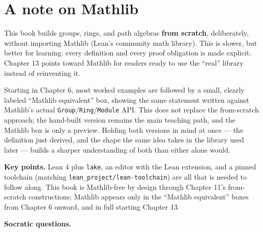 \section{A note on Mathlib}\label{sec:00-setup:04-mathlib-note:1}

This book builds groups, rings, and path algebras \textbf{from scratch}, deliberately, without importing Mathlib (Lean's community math library). This is slower, but better for learning: every definition and every proof obligation is made explicit. Chapter 13 points toward Mathlib for readers ready to use the ``real'' library instead of reinventing it.

Starting in Chapter 6, most worked examples are followed by a small, clearly labeled ``Mathlib equivalent'' box, showing the same statement written against Mathlib's actual \texttt{Group}/\texttt{Ring}/\texttt{Module} API. This does not replace the from-scratch approach; the hand-built version remains the main teaching path, and the Mathlib box is only a preview. Holding both versions in mind at once --- the definition just derived, and the shape the same idea takes in the library used later --- builds a sharper understanding of both than either alone would.

\textbf{Key points.} Lean 4 plus \texttt{lake}, an editor with the Lean extension, and a pinned toolchain (matching \texttt{lean\_\allowbreak{}project/\allowbreak{}lean-\allowbreak{}toolchain}) are all that is needed to follow along. This book is Mathlib-free by design through Chapter 11's from-scratch constructions; Mathlib appears only in the ``Mathlib equivalent'' boxes from Chapter 6 onward, and in full starting Chapter 13.

\textbf{Socratic questions.}

